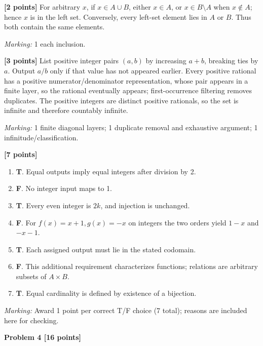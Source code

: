 \documentclass[12pt,letterpaper]{article}
\newcommand{\problemheading}[2][5\baselineskip]{\Needspace{#1}\par\noindent\hspace*{-0.625in}\textbf{#2}\par\nobreak\vspace{0.3em}}
\begin{document}
\begin{description}[font=\normalfont,leftmargin=1.2em,labelsep=0.4em]
\item[(a)] \textbf{[2 points]} For arbitrary $x$, if $x\in A\cup B$, either $x\in A$, or $x\in B\setminus A$ when $x\notin A$; hence $x$ is in the left set. Conversely, every left-set element lies in $A$ or $B$. Thus both contain the same elements.
\par\textit{Marking:} 1 each inclusion.
\item[(b)] \textbf{[3 points]} List positive integer pairs $(a,b)$ by increasing $a+b$, breaking ties by $a$. Output $a/b$ only if that value has not appeared earlier. Every positive rational has a positive numerator/denominator representation, whose pair appears in a finite layer, so the rational eventually appears; first-occurrence filtering removes duplicates. The positive integers are distinct positive rationals, so the set is infinite and therefore countably infinite.
\par\textit{Marking:} 1 finite diagonal layers; 1 duplicate removal and exhaustive argument; 1 infinitude/classification.
\item[(c)] \textbf{[7 points]} \begin{enumerate}[label=(\roman*)]\item \textbf{T}. Equal outputs imply equal integers after division by 2.\item \textbf{F}. No integer input maps to 1.\item \textbf{T}. Every even integer is $2k$, and injection is unchanged.\item \textbf{F}. For $f(x)=x+1,g(x)=-x$ on integers the two orders yield $1-x$ and $-x-1$.\item \textbf{T}. Each assigned output must lie in the stated codomain.\item \textbf{F}. This additional requirement characterizes functions; relations are arbitrary subsets of $A\times B$.\item \textbf{T}. Equal cardinality is defined by existence of a bijection.\end{enumerate}
\par\textit{Marking:} Award 1 point per correct T/F choice (7 total); reasons are included here for checking.
\end{description}
\vspace{0.65em}
\problemheading[\dimexpr 3\baselineskip+4\baselineskip\relax]{Problem 4 [16 points]}
\end{document}
